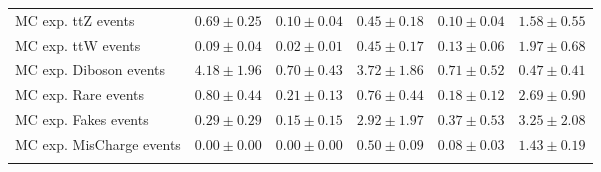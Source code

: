 \begin{tabular*}{\textwidth}{@{\extracolsep{\fill}}lrrrrr}
\noalign{\smallskip}\hline\noalign{\smallskip}


        MC exp. ttZ events         & $0.69 \pm 0.25$    & $0.10 \pm 0.04$   & $0.45 \pm 0.18$   & $0.10 \pm 0.04$   & $1.58 \pm 0.55$  \\


        MC exp. ttW events         & $0.09 \pm 0.04$    & $0.02 \pm 0.01$   & $0.45 \pm 0.17$   & $0.13 \pm 0.06$   & $1.97 \pm 0.68$  \\


        MC exp. Diboson events         & $4.18 \pm 1.96$    & $0.70 \pm 0.43$   & $3.72 \pm 1.86$   & $0.71 \pm 0.52$   & $0.47 \pm 0.41$  \\


        MC exp. Rare events         & $0.80 \pm 0.44$    & $0.21 \pm 0.13$   & $0.76 \pm 0.44$   & $0.18 \pm 0.12$   & $2.69 \pm 0.90$  \\


        MC exp. Fakes events         & $0.29 \pm 0.29$    & $0.15 \pm 0.15$   & $2.92 \pm 1.97$   & $0.37 \pm 0.53$   & $3.25 \pm 2.08$  \\


        MC exp. MisCharge events         & $0.00 \pm 0.00$    & $0.00 \pm 0.00$   & $0.50 \pm 0.09$   & $0.08 \pm 0.03$   & $1.43 \pm 0.19$  \\


\noalign{\smallskip}\hline\noalign{\smallskip}

\end{tabular*}
